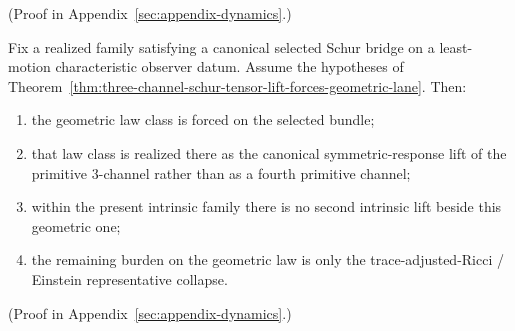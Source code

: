 (Proof in Appendix~\ref{sec:appendix-dynamics}.)

\begin{theorem}
\label{thm:geometry-unique-lift-of-primitive-three-channel}
Fix a realized family satisfying a canonical selected Schur bridge on a
least-motion characteristic observer datum. Assume the hypotheses of
Theorem~\ref{thm:three-channel-schur-tensor-lift-forces-geometric-lane}. Then:
\begin{enumerate}[label=(\roman*), leftmargin=2em, itemsep=0.2em]
\item the geometric law class is forced on the selected bundle;
\item that law class is realized there as the canonical symmetric-response lift
      of the primitive \(3\)-channel rather than as a fourth primitive
      channel;
\item within the present intrinsic family there is no second intrinsic
      lift beside this geometric one;
\item the remaining burden on the geometric law is only the
      trace-adjusted-Ricci / Einstein representative collapse.
\end{enumerate}
\end{theorem}

(Proof in Appendix~\ref{sec:appendix-dynamics}.)

